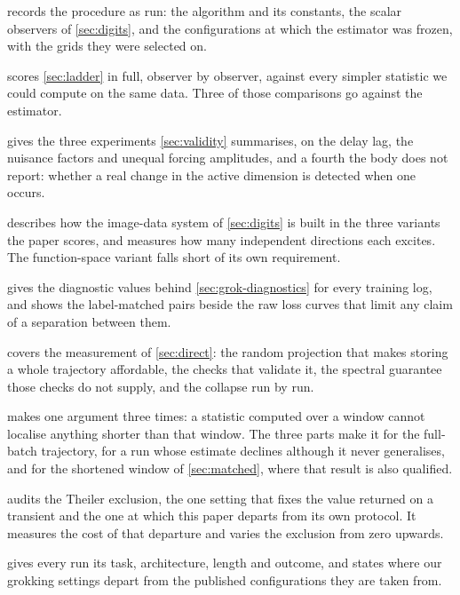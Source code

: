 \documentclass{article}
\begin{document}
\textbf{} records the procedure as run: the algorithm and its constants, the
scalar observers of \cref{sec:digits}, and the configurations at which the estimator was frozen,
with the grids they were selected on.

\textbf{} scores \cref{sec:ladder} in full, observer by observer, against every
simpler statistic we could compute on the same data. Three of those comparisons go against the
estimator.

\textbf{} gives the three experiments \cref{sec:validity} summarises, on the delay lag, the nuisance factors and unequal
forcing amplitudes, and a fourth the body does not
report: whether a real change in the active dimension is detected when one occurs.

\textbf{} describes how the image-data system of \cref{sec:digits} is built
in the three variants the paper scores, and measures how many independent directions each excites.
The function-space variant falls short of its own requirement.

\textbf{} gives the diagnostic values behind \cref{sec:grok-diagnostics} for every
training log, and shows the label-matched pairs beside the raw loss curves that limit any claim
of a separation between them.

\textbf{} covers the measurement of \cref{sec:direct}: the random projection that
makes storing a whole trajectory affordable, the checks that validate it, the spectral guarantee
those checks do not supply, and the collapse run by run.

\textbf{} makes one argument three times: a statistic computed over a window
cannot localise anything shorter than that window. The three parts make it for the full-batch
trajectory, for a run whose estimate declines although it never generalises, and for the shortened
window of \cref{sec:matched}, where that result is also qualified.

\textbf{} audits the Theiler exclusion, the one setting that fixes the value
returned on a transient and the one at which this paper departs from its own protocol. It measures
the cost of that departure and varies the exclusion from zero upwards.

\textbf{} gives every run its task, architecture, length and outcome, and states
where our grokking settings depart from the published configurations they are taken from.
\end{document}
